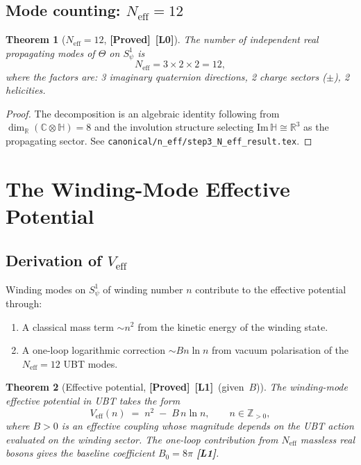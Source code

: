 \documentclass[12pt,a4paper]{article}
\newtheorem{theorem}{Theorem}[section]
\theoremstyle{definition}
\theoremstyle{remark}
\newcommand{\PROVED}{\textbf{[Proved]}}
\newcommand{\Lzero}{\textbf{[L0]}}
\newcommand{\Lone}{\textbf{[L1]}}
\newcommand{\CC}{\mathbb{C}}
\newcommand{\HH}{\mathbb{H}}
\newcommand{\ZZ}{\mathbb{Z}}
\newcommand{\RR}{\mathbb{R}}
\begin{document}
\subsection{Mode counting: $N_{\mathrm{eff}} = 12$}

\begin{theorem}[$N_{\mathrm{eff}} = 12$, \PROVED\ \Lzero]
\label{thm:neff}
The number of independent real propagating modes of $\Theta$ on $S^1_\psi$
is
\[
  N_{\mathrm{eff}} = 3 \times 2 \times 2 = 12,
\]
where the factors are: 3 imaginary quaternion directions, 2 charge sectors
($\pm$), 2 helicities.
\end{theorem}

\begin{proof}
The decomposition is an algebraic identity following from
$\dim_\RR(\CC\otimes\HH) = 8$ and the involution structure selecting
$\mathrm{Im}\,\HH \cong \RR^3$ as the propagating sector.  See
\texttt{canonical/n\_eff/step3\_N\_eff\_result.tex}.
\end{proof}

\section{The Winding-Mode Effective Potential}
\label{sec:veff}

\subsection{Derivation of $V_{\mathrm{eff}}$}

Winding modes on $S^1_\psi$ of winding number $n$ contribute to the
effective potential through:
\begin{enumerate}
  \item A classical mass term $\sim n^2$ from the kinetic energy of the
        winding state.
  \item A one-loop logarithmic correction $\sim Bn\ln n$ from vacuum
        polarisation of the $N_{\mathrm{eff}} = 12$ UBT modes.
\end{enumerate}

\begin{theorem}[Effective potential, \PROVED\ \Lone\ (given~$B$)]
\label{thm:veff}
The winding-mode effective potential in UBT takes the form
\begin{equation}
\label{eq:veff}
  V_{\mathrm{eff}}(n) \;=\; n^2 \;-\; B\,n\ln n,
  \qquad n \in \ZZ_{>0},
\end{equation}
where $B > 0$ is an effective coupling whose magnitude depends on the UBT
action evaluated on the winding sector.
The one-loop contribution from $N_{\mathrm{eff}}$ massless real bosons gives
the baseline coefficient $B_0 = 8\pi$ \Lone.
\end{theorem}
\end{document}
